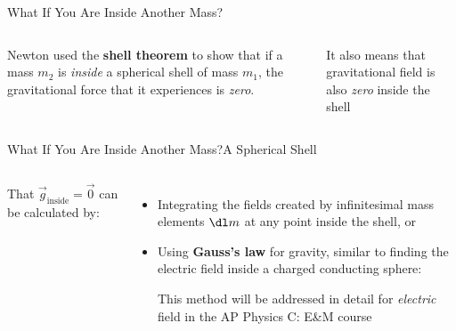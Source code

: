 \documentclass[12pt,compress,aspectratio=169]{beamer}
\begin{document}
\begin{frame}{What If You Are Inside Another Mass?}
  \begin{columns}

    Newton used the \textbf{shell theorem} to show that if a mass $m_2$ is
    \emph{inside} a spherical shell of mass $m_1$, the gravitational force that
    it experiences is \emph{zero}.
      
      
    It also means that gravitational field is also \emph{zero} inside the shell
  \end{columns}
\end{frame}



\begin{frame}{What If You Are Inside Another Mass?}{A Spherical Shell}
  \begin{columns}

    That $\vec g_\text{inside}=\vec 0$ can be calculated by:
    \begin{itemize}
    \item Integrating the fields created by infinitesimal mass elements $\dl m$
      at any point inside the shell, or
    \item Using \textbf{Gauss's law} for gravity, similar to finding the
      electric field inside a charged conducting sphere:
      

      \vspace{-.07in}This method will be addressed in detail for
      \emph{electric} field in the AP Physics C: E\&M course
    \end{itemize}
  \end{columns}
\end{frame}
\end{document}
